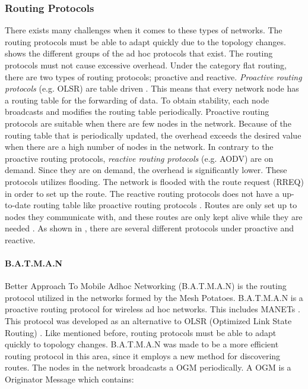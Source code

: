 \subsubsection{Routing Protocols}
There exists many challenges when it comes to these types of networks. The routing protocols must be able to adapt quickly due to the topology changes.  shows the different groups of the ad hoc protocols that exist. The routing protocols must not cause excessive overhead. Under the category flat routing, there are two types of routing protocols; proactive and reactive. \textit{Proactive routing protocols} (e.g. OLSR) are table driven \citep{proactivereactive}. This means that every network node has a routing table for the forwarding of data. To obtain stability, each node broadcasts and modifies the routing table periodically. Proactive routing protocols are suitable when there are few nodes in the network. Because of the routing table that is periodically updated, the overhead exceeds the desired value when there are a high number of nodes in the network. In contrary to the proactive routing protocols, \textit{reactive routing protocols} (e.g. AODV) are on demand. Since they are on demand, the overhead is significantly lower. These protocols utilizes flooding. The network is flooded with the route request (RREQ) in order to set up the route. The reactive routing protocols does not have a up-to-date routing table like proactive routing protocols \cite{proactivereactive}. Routes are only set up to nodes they communicate with, and these routes are only kept alive while they are needed  \cite{adhoc2}. As shown in , there are several different protocols under proactive and reactive. 

\paragraph{B.A.T.M.A.N}
Better Approach To Mobile Adhoc Networking (B.A.T.M.A.N) is the routing protocol utilized in the networks formed by the Mesh Potatoes. B.A.T.M.A.N is a proactive routing protocol for wireless ad hoc networks. This includes MANETs \cite{batman}. This protocol was developed as an alternative to OLSR (Optimized Link State Routing) \cite{batman2}. Like mentioned before, routing protocols must be able to adapt quickly to topology changes. B.A.T.M.A.N was made to be a more efficient routing protocol in this area, since it employs a new method for discovering routes. The nodes in the network broadcasts a OGM periodically. A OGM is a Originator Message which contains: 

